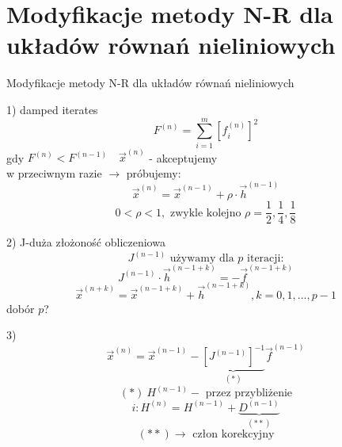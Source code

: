 \section{Modyfikacje metody N-R dla układów równań nieliniowych}

\begin{frame}{Modyfikacje metody N-R dla układów równań nieliniowych}
  \begin{block}{1) damped iterates}
    $$F^{(n)}=\sum_{i=1}^{m} [f_i^{(n)}]^2$$
    gdy $F^{(n)}<F^{(n-1)}\quad\overrightarrow{x}^{(n)}$ - akceptujemy\\
    w przeciwnym razie $\rightarrow$ próbujemy:
    $$\overrightarrow{x}^{(n)}=\overrightarrow{x}^{(n-1)}+\rho \cdot \overrightarrow{h}^{(n-1)}$$
    $$0<\rho<1,\text{ zwykle kolejno } \rho=\frac{1}{2},\frac{1}{4},\frac{1}{8}$$
  \end{block}
\end{frame}

\begin{frame}{}
  \begin{block}{2)}
    J-duża złożoność obliczeniowa
    $$J^{(n-1)}\text{ używamy dla }p\text{ iteracji:}$$
    $$J^{(n-1)} \cdot \overrightarrow{h}^{(n-1+k)}=-\overrightarrow{f}^{(n-1+k)}$$
    $$\overrightarrow{x}^{(n+k)}=\overrightarrow{x}^{(n-1+k)}+\overrightarrow{h}^{(n-1+k)}, k=0,1,...,p-1$$
    dobór $p$?
  \end{block}
\end{frame}

\begin{frame}{}
  \begin{block}{3)}
    $$\overrightarrow{x}^{(n)}=\overrightarrow{x}^{(n-1)}-\underbrace{[J^{(n-1)}]^{-1}}_{(*)}\overrightarrow{f}^{(n-1)}$$
    $$(*)\ H^{(n-1)}-\text{ przez przybliżenie}$$
    $${i:H^{(n)}=H^{(n-1)}+\underbrace{D^{(n-1)}}_{(**)}}$$
    $$(**)\rightarrow\text{ człon korekcyjny}$$
  \end{block}
\end{frame}